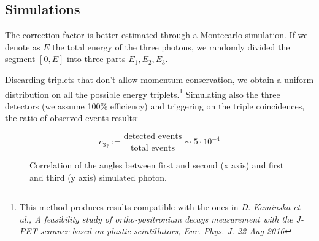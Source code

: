 \documentclass[main.tex]{subfiles}
\begin{document}
\subsection{Simulations}

The correction factor is better estimated through a Montecarlo simulation. If we denote as $E$ the total energy of the three photons, we randomly divided the segment $[0,E]$ into three parts $E_1,E_2,E_3$.


%
%
%

Discarding triplets that don't allow momentum conservation, we obtain a uniform distribution on all the possible energy triplets.\footnote{This method produces results compatible with the ones in \emph{D. Kaminska et al., A feasibility study of ortho-positronium decays measurement with the
J-PET scanner based on plastic scintillators, Eur. Phys. J. 22 Aug 2016}}
Simulating also the three detectors (we assume 100\% efficiency) and triggering on the triple coincidences, the ratio of observed events results:

\begin{equation*}
  c_{3\gamma} := \frac{\text{detected events}}{\text{total events}} \sim 5\cdot10^{-4}
\end{equation*}

\begin{figure}[H]
  \centering
  \caption{Correlation of the angles between first and second (x axis) and first and third (y axis) simulated photon.}
  \label{fig:sim:ang:corr}
\end{figure}
\end{document}
